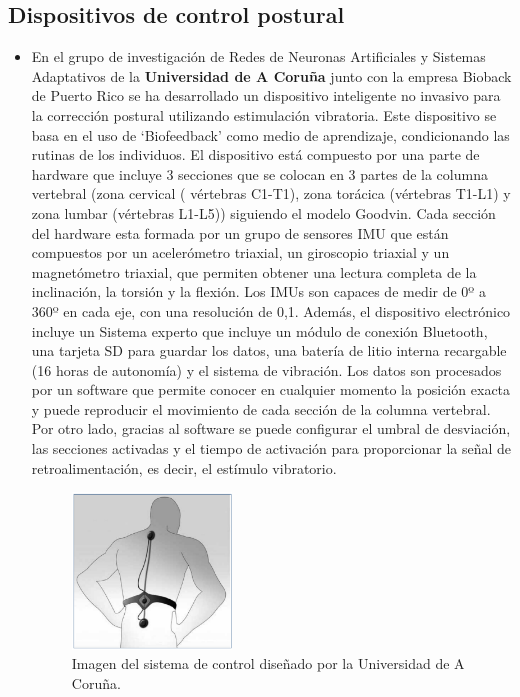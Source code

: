 \subsection{Dispositivos de control postural} 
\begin{itemize}
    \item En el grupo de investigación de Redes de Neuronas Artificiales y Sistemas Adaptativos de la \textbf{Universidad de A Coruña} junto con la empresa Bioback de Puerto Rico se ha desarrollado un dispositivo inteligente no invasivo para la corrección postural utilizando estimulación vibratoria\cite{dispUAC}. Este dispositivo se basa en el uso de ‘Biofeedback’ como medio de aprendizaje, condicionando las rutinas de los individuos.  \newline El dispositivo está compuesto por una parte de hardware que incluye 3 secciones que se colocan en 3 partes de la columna vertebral (zona cervical ( vértebras C1-T1), zona torácica (vértebras T1-L1) y zona lumbar (vértebras L1-L5)) siguiendo el modelo Goodvin\cite{Goodvin}. Cada sección del hardware esta formada por un grupo de sensores IMU que están compuestos por un acelerómetro triaxial, un giroscopio triaxial y un magnetómetro triaxial, que permiten obtener una lectura completa de la inclinación, la torsión y la flexión. Los IMUs son capaces de medir de 0º a 360º en cada eje, con una resolución de 0,1. Además, el dispositivo electrónico incluye un Sistema experto que incluye un módulo de conexión Bluetooth, una tarjeta SD para guardar los datos, una batería de litio interna recargable (16 horas de autonomía) y el sistema de vibración.  \newline Los datos son procesados por un software que permite conocer en cualquier momento la posición exacta y puede reproducir el movimiento de cada sección de la columna vertebral. Por otro lado, gracias al software se puede configurar el umbral de desviación, las secciones activadas y el tiempo de activación para proporcionar la señal de retroalimentación, es decir, el estímulo vibratorio. 

\begin{figure}[h!]
    \centering
    \includegraphics[width=0.4\textwidth]{img/imgUAC.png}
    \caption{Imagen del sistema de control diseñado por la Universidad de A Coruña.\cite{dispUAC}}
    \label{fig:imgUAC} 
\end{figure}



\end{itemize}
